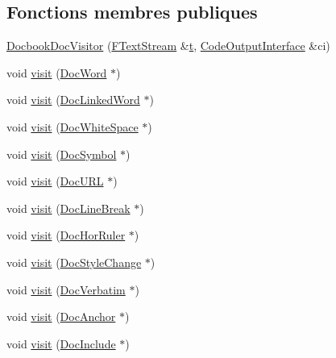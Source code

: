\subsection*{Fonctions membres publiques}
\begin{DoxyCompactItemize}
\item 
\hyperlink{class_docbook_doc_visitor_a559b9cfe0badf00f1756eaeb991d4509}{Docbook\+Doc\+Visitor} (\hyperlink{class_f_text_stream}{F\+Text\+Stream} \&\hyperlink{058__bracket__recursion_8tcl_a69e959f6901827e4d8271aeaa5fba0fc}{t}, \hyperlink{class_code_output_interface}{Code\+Output\+Interface} \&ci)
\item 
void \hyperlink{class_docbook_doc_visitor_a61416a9e72acfd363c870dde3e349153}{visit} (\hyperlink{class_doc_word}{Doc\+Word} $\ast$)
\item 
void \hyperlink{class_docbook_doc_visitor_ab8b99deb92d1e79e4ed88c6952a3535a}{visit} (\hyperlink{class_doc_linked_word}{Doc\+Linked\+Word} $\ast$)
\item 
void \hyperlink{class_docbook_doc_visitor_a8e86ebc50dece60a1037979f9122b0e5}{visit} (\hyperlink{class_doc_white_space}{Doc\+White\+Space} $\ast$)
\item 
void \hyperlink{class_docbook_doc_visitor_afb3421227804418869f484261f0a7a13}{visit} (\hyperlink{class_doc_symbol}{Doc\+Symbol} $\ast$)
\item 
void \hyperlink{class_docbook_doc_visitor_a93d7ea7e679f0579269706b25d0bff04}{visit} (\hyperlink{class_doc_u_r_l}{Doc\+U\+R\+L} $\ast$)
\item 
void \hyperlink{class_docbook_doc_visitor_a0561024b6dd9eb0703e7d904d0bdec25}{visit} (\hyperlink{class_doc_line_break}{Doc\+Line\+Break} $\ast$)
\item 
void \hyperlink{class_docbook_doc_visitor_abbab05288f1e850e62ef03619e0e8bcb}{visit} (\hyperlink{class_doc_hor_ruler}{Doc\+Hor\+Ruler} $\ast$)
\item 
void \hyperlink{class_docbook_doc_visitor_a4e5738bf7c89783b6e45ee99ba8808bc}{visit} (\hyperlink{class_doc_style_change}{Doc\+Style\+Change} $\ast$)
\item 
void \hyperlink{class_docbook_doc_visitor_a0420f2ae4e6d901e6e58bb78a3b8d401}{visit} (\hyperlink{class_doc_verbatim}{Doc\+Verbatim} $\ast$)
\item 
void \hyperlink{class_docbook_doc_visitor_ab2de0ff5a15d1122e6a173d89c0ce3d6}{visit} (\hyperlink{class_doc_anchor}{Doc\+Anchor} $\ast$)
\item 
void \hyperlink{class_docbook_doc_visitor_a47f57ffa435cb8b067c2ea0c63351da3}{visit} (\hyperlink{class_doc_include}{Doc\+Include} $\ast$)

\end{DoxyCompactItemize}
